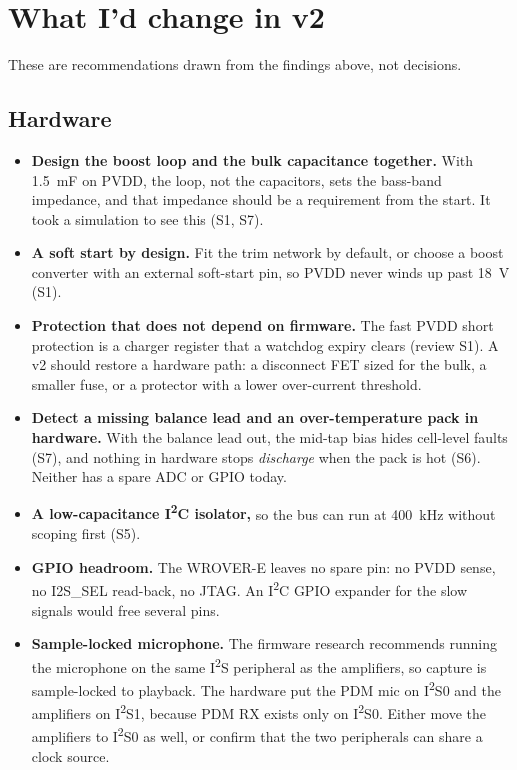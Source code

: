 \section{What I'd change in v2}\label{sec:v2}

These are recommendations drawn from the findings above, not decisions.

\subsection{Hardware}
\begin{itemize}
  \item \textbf{Design the boost loop and the bulk capacitance together.} With \qty{1.5}{\milli\farad} on PVDD, the loop, not the capacitors, sets the bass-band impedance, and that impedance should be a requirement from the start. It took a simulation to see this (S1, S7).
  \item \textbf{A soft start by design.} Fit the trim network by default, or choose a boost converter with an external soft-start pin, so PVDD never winds up past \qty{18}{\volt} (S1).
  \item \textbf{Protection that does not depend on firmware.} The fast PVDD short protection is a charger register that a watchdog expiry clears (review S1). A v2 should restore a hardware path: a disconnect FET sized for the bulk, a smaller fuse, or a protector with a lower over-current threshold.
  \item \textbf{Detect a missing balance lead and an over-temperature pack in hardware.} With the balance lead out, the mid-tap bias hides cell-level faults (S7), and nothing in hardware stops \emph{discharge} when the pack is hot (S6). Neither has a spare ADC or GPIO today.
  \item \textbf{A low-capacitance I\textsuperscript{2}C isolator,} so the bus can run at \qty{400}{\kilo\hertz} without scoping first (S5).
  \item \textbf{GPIO headroom.} The WROVER-E leaves no spare pin: no PVDD sense, no I2S\_SEL read-back, no JTAG. An I\textsuperscript{2}C GPIO expander for the slow signals would free several pins.
  \item \textbf{Sample-locked microphone.} The firmware research recommends running the microphone on the same I\textsuperscript{2}S peripheral as the amplifiers, so capture is sample-locked to playback. The hardware put the PDM mic on I\textsuperscript{2}S0 and the amplifiers on I\textsuperscript{2}S1, because PDM RX exists only on I\textsuperscript{2}S0. Either move the amplifiers to I\textsuperscript{2}S0 as well, or confirm that the two peripherals can share a clock source.

\end{itemize}

